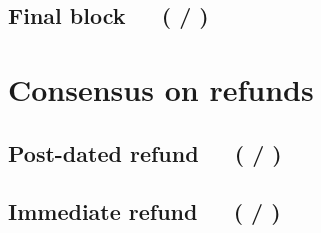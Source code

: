 \documentclass[../hydrozoa.tex]{subfiles}
\begin{document}


\subsection{Final block~~~( / )}%
\label{h:l2-consensus-final-block}%



\section{Consensus on refunds}%
\label{h:l2-consensus-on-refunds}%


\subsection{Post-dated refund~~~( / )}%
\label{h:l2-consensus-post-dated-refund}%



\subsection{Immediate refund~~~( / )}%
\label{h:l2-consensus-immediate-refund}%


\end{document}
